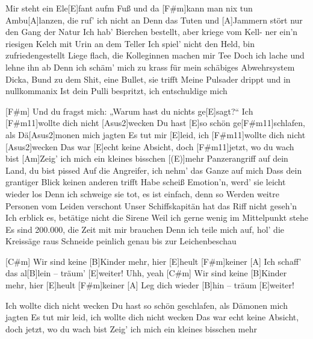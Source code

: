 



\begin{guitar}
	Mir steht ein Ele[E]fant aufm Fuß und da [F#m]kann man nix tun
	Ambu[A]lanzen, die ruf' ich nicht an
	Denn das Tuten und [A]Jammern stört nur den Gang der Natur
	Ich hab' Bierchen bestellt, aber kriege vom Kell-
	ner ein'n riesigen Kelch mit Urin an dem Teller
	Ich spiel' nicht den Held, bin zufriedengestellt
	Liege flach, die Kolleginnen machen mir Tee
	Doch ich lache und lehne ihn ab
	Denn ich schäm' mich zu krass für mein schäbiges Abwehrsystem
	Dicka, Bund zu dem Shit, eine Bullet, sie trifft
	Meine Pulsader drippt und in nullkommanix
	Ist dein Pulli bespritzt, ich entschuldige mich
	
	[F#m] Und du fragst mich: „Warum hast du nichts ge[E]sagt?“
	Ich [F#m11]wollte dich nicht [Asus2]wecken
	Du hast [E]so schön ge[F#m11]schlafen, als Dä[Asus2]monen mich jagten
	Es tut mir [E]leid, ich [F#m11]wollte dich nicht [Asus2]wecken
	Das war [E]echt keine Absicht, doch [F#m11]jetzt, wo du wach bist
	[Am]Zeig' ich mich ein kleines bisschen [(E)]mehr
	\pagebreak
	Panzerangriff auf dein Land, du bist pissed
	Auf die Angreifer, ich nehm' das Ganze auf mich
	Dass dein grantiger Blick keinen anderen trifft
	Habe scheiß Emotion'n, werd' sie leicht wieder los
	Denn ich schweige sie tot, es ist einfach, denn so
	Werden weitre Personen vom Leiden verschont
	Unser Schiffskapitän hat das Riff nicht geseh'n
	Ich erblick es, betätige nicht die Sirene
	Weil ich gerne wenig im Mittelpunkt stehe
	Es sind 200.000, die Zeit mit mir brauchen
	Denn ich teile mich auf, hol' die Kreissäge raus
	Schneide peinlich genau bis zur Leichenbeschau
	
	 
	
	[C#m] Wir sind keine [B]Kinder mehr, hier [E]heult [F#m]keiner
	[A] Ich schaff' das al[B]lein – träum' [E]weiter! Uhh, yeah
	[C#m] Wir sind keine [B]Kinder mehr, hier [E]heult [F#m]keiner
	[A] Leg dich wieder [B]hin – träum [E]weiter!
	
	Ich wollte dich nicht wecken
	Du hast so schön geschlafen, als Dämonen mich jagten
	Es tut mir leid, ich wollte dich nicht wecken
	Das war echt keine Absicht, doch jetzt, wo du wach bist
	Zeig' ich mich ein kleines bisschen mehr
\end{guitar}